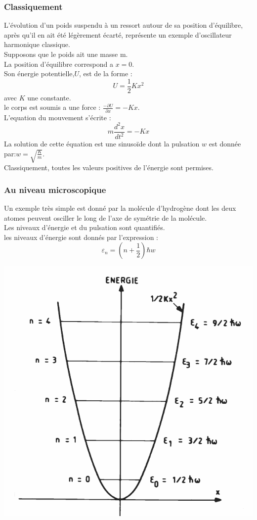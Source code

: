 \documentclass[12pt,oneside]{book}
\begin{document}
\subsubsection{Classiquement}
L'évolution d'un poids suspendu à un ressort autour de sa position d'équilibre, après qu'il en ait été légèrement écarté, représente un exemple d'oscillateur harmonique classique.\\
Supposons que le poids ait une masse m.\\
La position d'équilibre correspond a $x=0$.\\
Son énergie potentielle,$U$, est de la forme :
\[ U = \frac{1}{2}Kx^2 \]
avec $K$ une constante.\\
le corps est soumis a une force : $\frac{-\partial U}{\partial x} = -Kx$.\\
L'equation du mouvement s'écrite :
\[ m\frac{d^2x}{dt^2} = -Kx \]
La solution de cette équation est une sinusoïde dont la pulsation $w$ est donnée par:$w = \sqrt{\frac{K}{m}}$.\\
Classiquement, toutes les valeurs positives de l'énergie sont permises.
\subsubsection{Au niveau microscopique}
Un exemple très simple est donné par la molécule d'hydrogène dont les deux atomes peuvent osciller le long de l'axe de symétrie de la molécule.\\
Les niveaux d'énergie et du pulsation sont quantifiés.\\
les niveaux d'énergie sont donnés par l'expression :
\[ \varepsilon_n = (n + \frac{1}{2})\hbar w \]
\begin{center}
	\includegraphics[width=0.5\linewidth]{../pic/3306/3.png}
\end{center}
\end{document}
